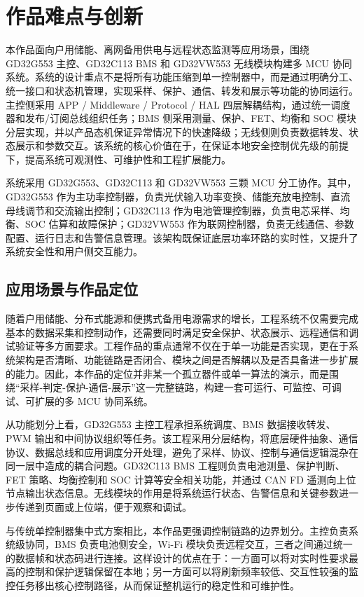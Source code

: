 \section{作品难点与创新}

本作品面向户用储能、离网备用供电与远程状态监测等应用场景，围绕 GD32G553 主控、GD32C113 BMS 和 GD32VW553 无线模块构建多 MCU 协同系统。系统的设计重点不是将所有功能压缩到单一控制器中，而是通过明确分工、统一接口和状态机管理，实现采样、保护、通信、转发和展示等功能的协同运行。主控侧采用 APP / Middleware / Protocol / HAL 四层解耦结构，通过统一调度器和发布/订阅总线组织任务；BMS 侧采用测量、保护、FET、均衡和 SOC 模块分层实现，并以产品态机保证异常情况下的快速降级；无线侧则负责数据转发、状态展示和参数交互。该系统的核心价值在于，在保证本地安全控制优先级的前提下，提高系统可观测性、可维护性和工程扩展能力。

系统采用 GD32G553、GD32C113 和 GD32VW553 三颗 MCU 分工协作。其中，GD32G553 作为主功率控制器，负责光伏输入功率变换、储能充放电控制、直流母线调节和交流输出控制；GD32C113 作为电池管理控制器，负责电芯采样、均衡、SOC 估算和故障保护；GD32VW553 作为联网控制器，负责无线通信、参数配置、运行日志和告警信息管理。该架构既保证底层功率环路的实时性，又提升了系统安全性和用户侧交互能力。

\subsection{应用场景与作品定位}

随着户用储能、分布式能源和便携式备用电源需求的增长，工程系统不仅需要完成基本的数据采集和控制动作，还需要同时满足安全保护、状态展示、远程通信和调试验证等多方面要求。工程作品的重点通常不仅在于单一功能是否实现，更在于系统架构是否清晰、功能链路是否闭合、模块之间是否解耦以及是否具备进一步扩展的能力。因此，本作品的定位并非某一个孤立器件或单一算法的演示，而是围绕“采样-判定-保护-通信-展示”这一完整链路，构建一套可运行、可监控、可调试、可扩展的多 MCU 协同系统。

从功能划分上看，GD32G553 主控工程承担系统调度、BMS 数据接收转发、PWM 输出和中间协议组织等任务。该工程采用分层结构，将底层硬件抽象、通信协议、数据总线和应用调度分开处理，避免了采样、协议、控制与通信逻辑混杂在同一层中造成的耦合问题。GD32C113 BMS 工程则负责电池测量、保护判断、FET 策略、均衡控制和 SOC 计算等安全相关功能，并通过 CAN FD 遥测向上位节点输出状态信息。无线模块的作用是将系统运行状态、告警信息和关键参数进一步传递到页面或上位端，便于观察和调试。

与传统单控制器集中式方案相比，本作品更强调控制链路的边界划分。主控负责系统级协同，BMS 负责电池侧安全，Wi-Fi 模块负责远程交互，三者之间通过统一的数据帧和状态码进行连接。这样设计的优点在于：一方面可以将对实时性要求最高的控制和保护逻辑保留在本地；另一方面可以将刷新频率较低、交互性较强的监控任务移出核心控制路径，从而保证整机运行的稳定性和可维护性。

